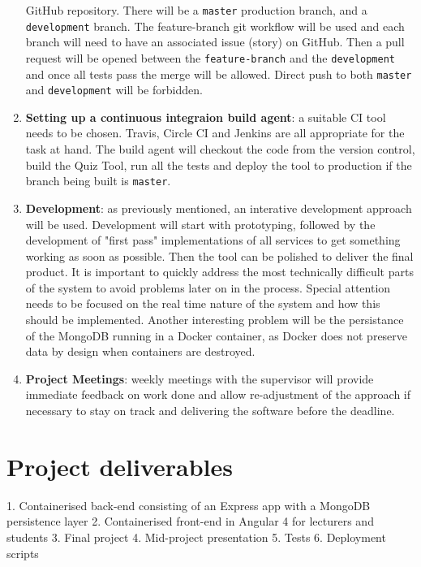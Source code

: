 \documentclass[11pt,fleqn,twoside]{article}
\begin{document}
\begin{enumerate}
    GitHub repository. There will be a \texttt{master} production branch, and a \texttt{development} branch.
    The feature-branch git workflow will be used and each branch will need to have an associated issue (story)
    on GitHub. Then a pull request will be opened between the \texttt{feature-branch} and the \texttt{development}
    and once all tests pass the merge will be allowed. Direct push to both \texttt{master} and \texttt{development}
    will be forbidden.
  \item \textbf{Setting up a continuous integraion build agent}: a suitable CI tool needs to be chosen. Travis, Circle CI
    and Jenkins are all appropriate for the task at hand. The build agent will checkout the code from the version control,
    build the Quiz Tool, run all the tests and deploy the tool to production if the branch being built is \texttt{master}.
  \item \textbf{Development}: as previously mentioned, an interative development approach will be used. Development will start
    with prototyping, followed by the development of "first pass" implementations of all services to get something
    working as soon as possible. Then the tool can be polished to deliver the final product. It is important to quickly
    address the most technically difficult parts of the system to avoid problems later on in the process. Special
    attention needs to be focused on the real time nature of the system and how this should be implemented. Another
    interesting problem will be the persistance of the MongoDB running in a Docker container, as Docker does not
    preserve data by design when containers are destroyed.
  \item \textbf{Project Meetings}: weekly meetings with the supervisor will provide immediate feedback on work done
    and allow re-adjustment of the approach if necessary to stay on track and delivering the software before the deadline.
\end{enumerate}

\section{Project deliverables}
1. Containerised back-end consisting of an Express app with a MongoDB persistence layer
2. Containerised front-end in Angular 4 for lecturers and students
3. Final project
4. Mid-project presentation
5. Tests
6. Deployment scripts
\end{document}
